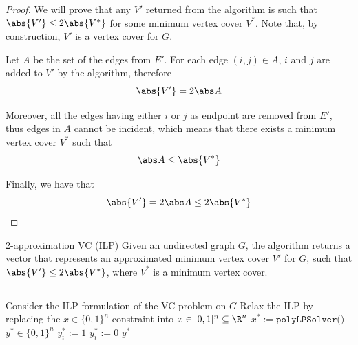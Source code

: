 \documentclass[a4paper, 12pt]{report}
\begin{document}


    \begin{proof}
        We will prove that any $V'$ returned from the algorithm is such that $\abs{V'} \le 2 \abs {V^*}$ for some minimum vertex cover $V^*$. Note that, by construction, $V'$ is a vertex cover for $G$.

        Let $A$ be the set of the edges  from $E'$. For each edge $(i, j) \in A$, $i$ and $j$ are added to $V'$ by the algorithm, therefore $$\abs{V'} = 2 \abs A$$

        Moreover, all the edges having either $i$ or $j$ as endpoint are removed from $E'$, thus edges in $A$ cannot be incident, which means that there exists a minimum vertex cover $V^*$ such that $$\abs A \le \abs{V^*}$$

        Finally, we have that $$\abs{V'} = 2 \abs A \le 2 \abs{V^*}$$
    \end{proof}

    \begin{framedalgo}{2-approximation VC (ILP)}
        Given an undirected graph $G$, the algorithm returns a vector that represents an approximated minimum vertex cover $V'$ for $G$, such that $\abs{V'} \le 2 \abs {V^*}$, where $V^*$ is a minimum vertex cover. \\
        \hrule

        \quad
        \label{alg:2-approx_vc_ilp}
        \begin{algorithmic}[1]
                \State Consider the ILP formulation of the VC problem on $G$
                \State Relax the ILP by replacing the $x \in \{0, 1\}^n$ constraint into $x \in [0, 1]^n \subseteq \R^n$
                \State $x^* := \texttt{polyLPSolver()}$
                \State $y^* \in \{0, 1\}^n$
                        \State $y_i^* := 1$
                    \Else
                        \State $y_i^* := 0$
                    \EndIf
                \EndFor
                \State {} $y^*$
            \EndFunction
        \end{algorithmic}
    \end{framedalgo}
\end{document}
